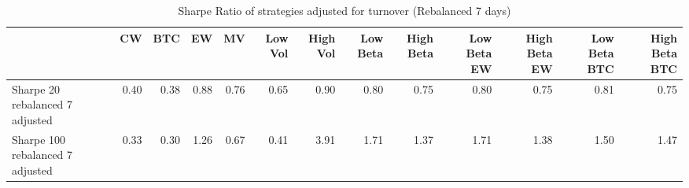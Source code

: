 \begin{table}
\centering
\caption{Sharpe Ratio of strategies adjusted for turnover (Rebalanced 7 days)}
\label{sharpe7}
\begin{tabular}{lrrrrrrrrrrrr}
\toprule
{} &   CW &  BTC &   EW &   MV &  Low Vol &  High Vol &  Low Beta &  High Beta &  Low Beta EW &  High Beta EW &  Low Beta BTC &  High Beta BTC \\
\midrule
Sharpe 20 rebalanced 7 adjusted  & 0.40 & 0.38 & 0.88 & 0.76 &     0.65 &      0.90 &      0.80 &       0.75 &         0.80 &          0.75 &          0.81 &           0.75 \\
Sharpe 100 rebalanced 7 adjusted & 0.33 & 0.30 & 1.26 & 0.67 &     0.41 &      3.91 &      1.71 &       1.37 &         1.71 &          1.38 &          1.50 &           1.47 \\
\bottomrule
\end{tabular}
\end{table}
